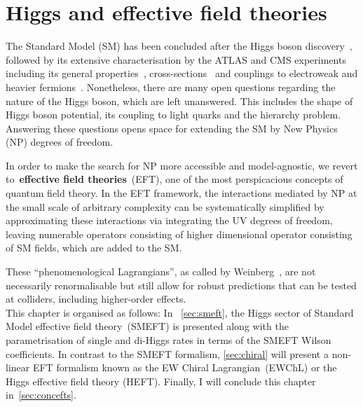 \chapter{Higgs and effective field theories }\label{chap:HiggsEFT}
\par The Standard Model (SM) has been concluded after the Higgs boson discovery~\cite{ATLAS:2012yve,CMS:2012qbp}, followed by its extensive characterisation by the ATLAS and CMS experiments including its general properties~\cite{ATLAS:2015yey,ATLAS:2018tdk,CMS:2017dib,CMS:2020xrn,ATLAS:2018jym,CMS:2019ekd,ATLAS:2015zhl, CMS:2014nkk},  cross-sections~\cite{CMS:2018gwt,ATLAS:2019jst,ATLAS:2019mju,CMS:2019chr} and couplings to electroweak and heavier fermions~\cite{ATLAS2021vrm,CMS:2020gsy}. Nonetheless, there are many open questions regarding the nature of the Higgs boson, which are left unanswered. This includes the shape of Higgs boson potential, its coupling to light quarks and the hierarchy problem. Answering these questions opens space for extending the SM by New Physics (NP) degrees of freedom.
\par In order to make the search for NP more accessible and model-agnostic, we revert to~\textbf{effective field theories}~(EFT), one of the most perspicacious concepts of quantum field theory. In the EFT framework, the interactions mediated by NP at the small scale of arbitrary complexity can be systematically simplified by approximating these interactions via integrating the UV degrees of freedom, leaving numerable operators consisting of higher dimensional operator consisting of SM fields, which are added to the SM.  
\par These ``phenomenological Lagrangians'', as called by Weinberg~\cite{WEINBERG1979327}, are not necessarily renormalisable but still allow for robust predictions that can be tested at colliders, including higher-order effects. \\
This chapter is organised as follows:  In ~\autoref{sec:smeft}, the Higgs sector of Standard Model effective field theory~(SMEFT) is presented along with the parametrisation of single and di-Higgs rates in terms of the SMEFT Wilson coefficients. In contrast to the SMEFT formalism, \autoref{sec:chiral} will present a non-linear EFT formalism known as the EW Chiral Lagrangian~(EWChL) or the  Higgs effective field theory (HEFT). Finally, I will conclude this chapter in~\autoref{sec:concefts}.
